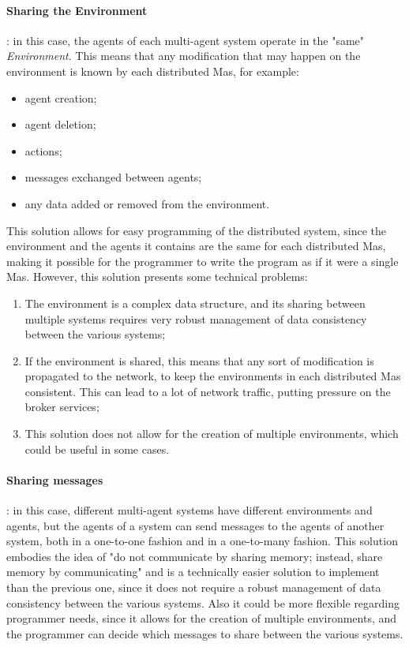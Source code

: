 \paragraph{Sharing the Environment}: in this case, the agents of each multi-agent system operate in the "same" \textit{Environment}. This means that any modification that may happen on the environment is known by each distributed Mas, for example:
\begin{itemize}
    \item agent creation;
    \item agent deletion;
    \item actions;
    \item messages exchanged between agents;
    \item any data added or removed from the environment.
\end{itemize}

This solution allows for easy programming of the distributed system, since the environment and the agents it contains are the same for each distributed Mas, making it possible for the programmer to write the program as if it were a single Mas.
However, this solution presents some technical problems:
\begin{enumerate}
    \item The environment is a complex data structure, and its sharing between multiple systems requires very robust management of data consistency between the various systems;
    \item If the environment is shared, this means that any sort of modification is propagated to the network, to keep the environments in each distributed Mas consistent. This
          can lead to a lot of network traffic, putting pressure on the broker services;
    \item This solution does not allow for the creation of multiple environments, which could be useful in some cases.
\end{enumerate}

\paragraph{Sharing messages}: in this case, different multi-agent systems have different environments and agents, but the agents of a system can send messages to the agents of another system, both in a one-to-one fashion and in a one-to-many fashion.
This solution embodies the idea of "do not communicate by sharing memory; instead, share memory by communicating" and is a technically easier solution to implement than the previous one, since it does not require a robust management of data consistency between the various systems.
Also it could be more flexible regarding programmer needs, since it allows for the creation of multiple environments, and the programmer can decide which messages to share between the various systems.

